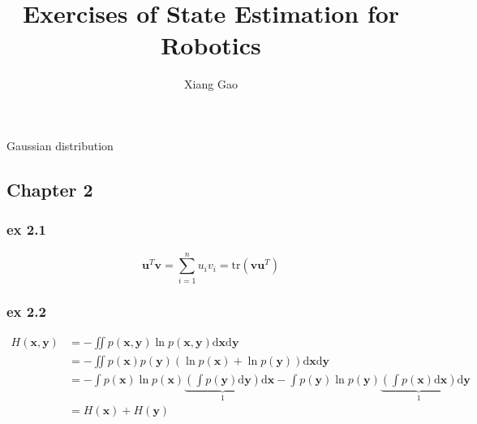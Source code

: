 \documentclass[10pt]{article}
\title{Exercises of State Estimation for Robotics}
\author{Xiang Gao}
\begin{document}
\maketitle

Gaussian distribution
\subsection{Chapter 2}
\subsubsection{ex 2.1}
\begin{equation}
{\mathbf{u}^T}\mathbf{v} = \sum\limits_{i = 1}^n {{u_i}{v_i}}  = \mathrm{tr}\left( {\mathbf{v}{\mathbf{u}^T}} \right)
\end{equation}

\subsubsection{ex 2.2}
\begin{equation}
\begin{split}
H\left( {\mathbf{x},\mathbf{y}} \right) &=  - \iint {p\left( {\mathbf{x},\mathbf{y}} \right)\ln }p\left( {\mathbf{x},\mathbf{y}} \right)\mathrm{d}\mathbf{x}\mathrm{d}\mathbf{y} \\ 
&=  - \iint {p\left( \mathbf{x} \right)p\left( \mathbf{y} \right)\left( {\ln p\left( \mathbf{x} \right) + \ln p\left( \mathbf{y} \right)} \right)\mathrm{d}\mathbf{x}\mathrm{d}\mathbf{y}} \\ 
&=  - \int {p\left( \mathbf{x} \right)\ln p\left( \mathbf{x} \right)\underbrace {\left( {\int {p\left( \mathbf{y} \right)\mathrm{d}\mathbf{y}} } \right)}_1\mathrm{d}\mathbf{x} - \int {p\left( \mathbf{y} \right)\ln p\left( \mathbf{y} \right)\underbrace {\left( {\int {p\left( \mathbf{x} \right)\mathrm{d}\mathbf{x}} } \right)}_1\mathrm{d}\mathbf{y}} }  \\ 
&= H\left( \mathbf{x} \right) + H\left( \mathbf{y} \right) \\ 
\end{split}
\end{equation}
\end{document}
